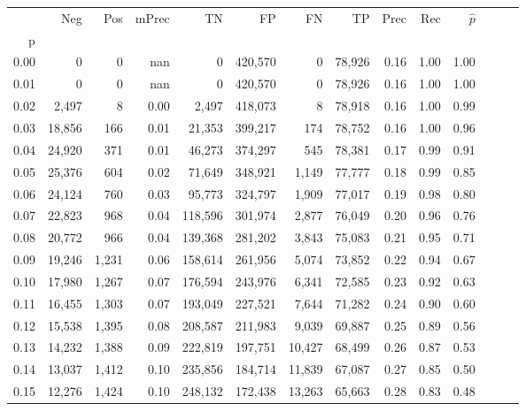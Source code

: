 \begin{tabular}{rrrrrrrrrrrrrr}
\toprule
{} &     Neg &    Pos & mPrec &       TN &       FP &      FN &      TP &  Prec &   Rec & $\hat{p}$ \\
p    &         &        &       &          &          &         &         &       &       &           \\
\midrule
0.00 &       0 &      0 &   nan &        0 &  420,570 &       0 &  78,926 &  0.16 &  1.00 &      1.00 \\
0.01 &       0 &      0 &   nan &        0 &  420,570 &       0 &  78,926 &  0.16 &  1.00 &      1.00 \\
0.02 &   2,497 &      8 &  0.00 &    2,497 &  418,073 &       8 &  78,918 &  0.16 &  1.00 &      0.99 \\
0.03 &  18,856 &    166 &  0.01 &   21,353 &  399,217 &     174 &  78,752 &  0.16 &  1.00 &      0.96 \\
0.04 &  24,920 &    371 &  0.01 &   46,273 &  374,297 &     545 &  78,381 &  0.17 &  0.99 &      0.91 \\
0.05 &  25,376 &    604 &  0.02 &   71,649 &  348,921 &   1,149 &  77,777 &  0.18 &  0.99 &      0.85 \\
0.06 &  24,124 &    760 &  0.03 &   95,773 &  324,797 &   1,909 &  77,017 &  0.19 &  0.98 &      0.80 \\
0.07 &  22,823 &    968 &  0.04 &  118,596 &  301,974 &   2,877 &  76,049 &  0.20 &  0.96 &      0.76 \\
0.08 &  20,772 &    966 &  0.04 &  139,368 &  281,202 &   3,843 &  75,083 &  0.21 &  0.95 &      0.71 \\
0.09 &  19,246 &  1,231 &  0.06 &  158,614 &  261,956 &   5,074 &  73,852 &  0.22 &  0.94 &      0.67 \\
0.10 &  17,980 &  1,267 &  0.07 &  176,594 &  243,976 &   6,341 &  72,585 &  0.23 &  0.92 &      0.63 \\
0.11 &  16,455 &  1,303 &  0.07 &  193,049 &  227,521 &   7,644 &  71,282 &  0.24 &  0.90 &      0.60 \\
0.12 &  15,538 &  1,395 &  0.08 &  208,587 &  211,983 &   9,039 &  69,887 &  0.25 &  0.89 &      0.56 \\
0.13 &  14,232 &  1,388 &  0.09 &  222,819 &  197,751 &  10,427 &  68,499 &  0.26 &  0.87 &      0.53 \\
0.14 &  13,037 &  1,412 &  0.10 &  235,856 &  184,714 &  11,839 &  67,087 &  0.27 &  0.85 &      0.50 \\
0.15 &  12,276 &  1,424 &  0.10 &  248,132 &  172,438 &  13,263 &  65,663 &  0.28 &  0.83 &      0.48 \\

\end{tabular}
